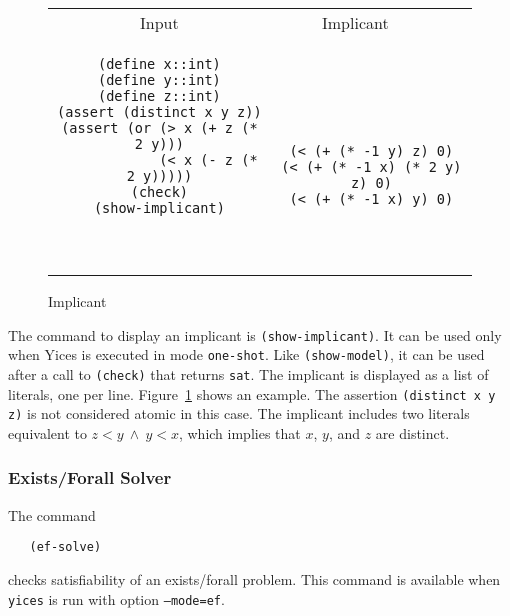 \documentclass[11pt,twoside,fleqn,openright,titlepage]{cslreport}
\begin{document}
\begin{figure}
\begin{footnotesize}
\begin{center}
\begin{tabular}{c|c}
\multicolumn{1}{c}{Input} & \multicolumn{1}{c}{Implicant~~~~} \\[0.4em]

\begin{minipage}[c]{6.2cm}
\begin{verbatim}
(define x::int)
(define y::int)
(define z::int)
(assert (distinct x y z))
(assert (or (> x (+ z (* 2 y)))
            (< x (- z (* 2 y)))))
(check)
(show-implicant)
\end{verbatim}
\end{minipage}~~
&
~~~\begin{minipage}[c]{6cm}
\begin{verbatim}
(< (+ (* -1 y) z) 0)
(< (+ (* -1 x) (* 2 y) z) 0)
(< (+ (* -1 x) y) 0)
\end{verbatim}
\end{minipage}
\end{tabular}
\end{center}
\end{footnotesize}
\caption{Implicant}
\label{implicant-format}
\end{figure}

\medskip\noindent The command to display an implicant is
\texttt{(show-implicant)}. It can be used only when Yices is executed
in mode \texttt{one-shot}. Like \texttt{(show-model)}, it can be used
after a call to \texttt{(check)} that returns \texttt{sat}. The
implicant is displayed as a list of literals, one per
line. Figure~\ref{implicant-format} shows an example. The assertion
\texttt{(distinct x y z)} is not considered atomic in this case. The
implicant includes two literals equivalent to $z < y\ \wedge\ y < x$,
which implies that $x$, $y$, and $z$ are distinct.


\subsubsection*{Exists/Forall Solver}

The command
\begin{small}
\begin{verbatim}
   (ef-solve)
\end{verbatim}
\end{small}
checks satisfiability of an exists/forall problem. This command is
available when \texttt{yices} is run with option \texttt{--mode=ef}.
\end{document}

